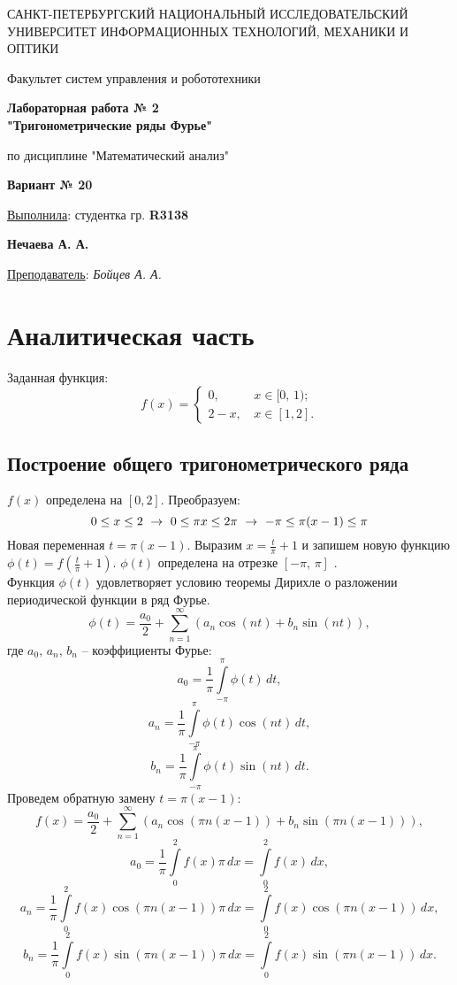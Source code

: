 \documentclass[a5paper, 10pt]{article}
\theoremstyle{definition}
\theoremstyle{plain}
\theoremstyle{remark}
\newcommand*{\titlePage}{
	\thispagestyle{title}
	\begingroup
	\begin{center}
		\vspace*{6ex}
		
		{\small
			САНКТ-ПЕТЕРБУРГСКИЙ НАЦИОНАЛЬНЫЙ ИССЛЕДОВАТЕЛЬСКИЙ УНИВЕРСИТЕТ ИНФОРМАЦИОННЫХ ТЕХНОЛОГИЙ, МЕХАНИКИ И ОПТИКИ	
		}
		
		\vspace*{2ex}
		
		{\normalsize
			Факультет систем управления и робототехники
		}
		
		\vspace*{15ex}
		
		{\Large \bfseries 
			Лабораторная работа № 2\\
"Тригонометрические ряды Фурье"
		}
\vspace*{2ex}
		
		{\normalsize
			по дисциплине "Математический анализ"
		}

                    \vspace*{2ex}

                    { \bfseries 
			Вариант № 20
		}
	\end{center}
	\vspace*{20ex}
	\begin{flushright}
		{\large 
			\underline{Выполнила}: студентка гр. \textbf{R3138}\\
			\begin{flushright}
				\textbf{Нечаева А. А.}\\
			\end{flushright}
		}
		
		\vspace*{5ex}
		
		{\large 
			\underline{Преподаватель}: \textit{Бойцев А. А.}
		}
	\end{flushright}	
	\newpage
	\setcounter{page}{2}
	\endgroup}
\begin{document}
	\titlePage
	\pagestyle{style}
\newpage

\section{Аналитическая часть}
Заданная функция:
\begin{equation}
f(x) = 
\begin{cases}
0, \, & x \in [0, \, 1);\\
2 - x, \, & x \in [1, 2].
\end{cases}
\end{equation}


\subsection{Построение общего тригонометрического ряда}	
$f(x)$ определена на $[0, 2]$. Преобразуем:
\begin{equation*}
0 \leq x \leq 2  \, \, \to \, \,
0 \leq \pi x \leq 2 \pi \, \, \to \, \,
-\pi \leq \pi(x-1) \leq \pi\\
\end{equation*}
Новая переменная $t =\pi(x-1)$. Выразим $x = \frac{t}{\pi} + 1$ и запишем новую функцию $\phi (t) = f( \frac{t}{\pi} + 1)$. $\phi (t)$ определена на отрезке $[-\pi, \, \pi]$ .\\
Функция $\phi (t)$ удовлетворяет условию теоремы Дирихле о разложении периодической функции в ряд Фурье.
\begin{equation*}
\phi (t) = \frac{a_0}{2} + \sum \limits_{n = 1}^{\infty} \left( a_n \cos(nt) + b_n \sin(nt) \right), 
\end{equation*}
где $a_0, \, a_n, \, b_n$ -- коэффициенты Фурье:\\
\begin{equation*}
a_0 = \frac{1}{\pi} \int \limits_{-\pi}^{\pi} \phi(t) \, dt,
\end{equation*}
\begin{equation*}
a_n = \frac{1}{\pi} \int \limits_{-\pi}^{\pi} \phi(t) \cos(nt) \, dt,
\end{equation*}
\begin{equation*}
b_n = \frac{1}{\pi} \int \limits_{-\pi}^{\pi} \phi(t) \sin(nt) \, dt.
\end{equation*}
Проведем обратную замену $t =\pi(x-1)$:
\begin{equation*}
f (x) = \frac{a_0}{2} + \sum \limits_{n = 1}^{\infty} \left( a_n \cos(\pi n(x-1)) + b_n \sin(\pi n(x-1)) \right), 
\end{equation*}
\begin{equation*}
a_0 = \frac{1}{\pi} \int \limits_{0}^{2} f(x) \pi \, dx = \int \limits_{0}^{2} f(x) \, dx, 
\end{equation*}
\begin{equation*}
a_n = \frac{1}{\pi} \int \limits_{0}^{2} f(x) \cos(\pi n(x-1))  \pi \, dx = \int \limits_{0}^{2} f(x) \cos(\pi n(x-1)) \, dx ,
\end{equation*}
\begin{equation*}
b_n = \frac{1}{\pi} \int \limits_{0}^{2} f(x) \sin(\pi n(x-1)) \pi \, dx = \int \limits_{0}^{2} f(x) \sin(\pi n(x-1)) \, dx .
\end{equation*}
\end{document}
